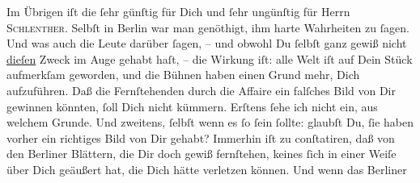 \pstart
           Im Übrigen iſt die \label{K_L02931-3v}\label{K_L02931-3}{ }ſehr günſtig für Dich und{ }ſehr ungünſtig für Herrn \textsc{Schlenther}. Selbſt in Berlin war man genöthigt, ihm
               harte Wahrheiten zu{ }ſagen. Und was auch die Leute darüber{ }ſagen, – und obwohl Du{ }ſelbſt {\pb}ganz gewiß nicht \uline{dieſen} Zweck im Auge gehabt haſt, – die Wirkung iſt:  alle Welt iſt auf Dein Stück aufmerkſam geworden, und die Bühnen
               haben einen Grund mehr, Dich aufzuführen. Daß die Fernſtehenden durch die Affaire ein
               falſches Bild von  Dir gewinnen könnten,{ }ſoll Dich
               nicht kümmern. Erſtens{ }ſehe ich nicht ein, aus welchem Grunde. Und zweitens,{ }ſelbſt
               wenn es{ }ſo{ }ſein{ }ſollte: glaubſt Du,{ }ſie haben vorher ein richtiges Bild von Dir
               gehabt? {\pb}Immerhin iſt zu conſtatiren, daß von den
                  Berliner Blättern, die Dir doch gewiß
               fernſtehen, keines{ }ſich in einer Weiſe über Dich geäußert hat, die Dich hätte
               verletzen können. Und wenn das Berliner
